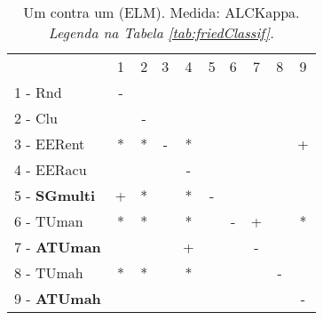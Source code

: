 \begin{table}[h]
\caption{Um contra um (ELM). Medida: ALCKappa. \textit{Legenda na Tabela \ref{tab:friedClassif}.}}
\begin{center}\begin{tabular}{lcc|cc|cc|cc|c}
 			& 1 & 2 & 3 & 4 & 5 & 6 & 7 & 8 & 9\\
1 - Rnd  	& - &   &   &   &   &   &   &   &   \\
2 - Clu  	&   & - &   &   &   &   &   &   &   \\ \hline
3 - EERent	& * & * & - & * &   &   &   &   & + \\
4 - EERacu	&   &   &   & - &   &   &   &   &   \\ \hline
5 - \textbf{SGmulti}	& + & * &   & * & - &   &   &   &   \\
6 - TUman	& * & * &   & * &   & - & + &   & * \\ \hline
7 - \textbf{ATUman}	&   &   &   & + &   &   & - &   &   \\
8 - TUmah	& * & * &   & * &   &   &   & - &   \\ \hline
9 - \textbf{ATUmah}	&   &   &   &   &   &   &   &   & - \\\end{tabular}
\label{stratsALCKappaFriedELMRedux}
\end{center}
\end{table}